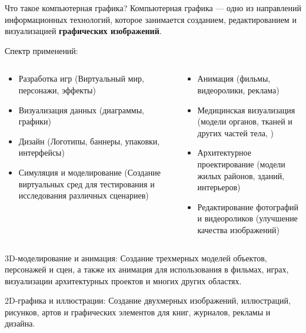 \documentclass{beamer}
\begin{document}
	\begin{frame}{Что такое компьютерная графика?}
		Компьютерная графика --- одно из направлений информационных технологий, которое занимается созданием, редактированием и визуализацией \textbf{графических изображений}.
		
		Спектр применений:
		
		\begin{columns}
			
			\begin{column}{0.5\textwidth}
				\begin{itemize}
				\item
				Разработка игр (Виртуальный мир, персонажи, эффекты)
				
				\item
				Визуализация данных (диаграммы, графики)
				\item
				Дизайн (Логотипы, баннеры, упаковки, интерфейсы)
				\item
				Симуляция и моделирование (Создание виртуальных сред для тестирования и исследования различных сценариев)
				
			\end{itemize}
			\end{column}
			\begin{column}{0.5\textwidth}
				\begin{itemize}
					\item
					Анимация (фильмы, видеоролики, реклама)
				\item
				Медицинская визуализация (модели органов, тканей и других частей тела, )
				\item
				Архитектурное проектирование (модели жилых районов, зданий, интерьеров)
				
				\item
				Редактирование фотографий и видеороликов (улучшение качества изображений)
			\end{itemize}
			\end{column}
		
		\end{columns}
		
		3D-моделирование и анимация: Создание трехмерных моделей объектов, персонажей и сцен, а также их анимация для использования в фильмах, играх, визуализации архитектурных проектов и многих других областях.
		
		2D-графика и иллюстрации: Создание двухмерных изображений, иллюстраций, рисунков, артов и графических элементов для книг, журналов, рекламы и дизайна.
		

\end{frame}
\end{document}

